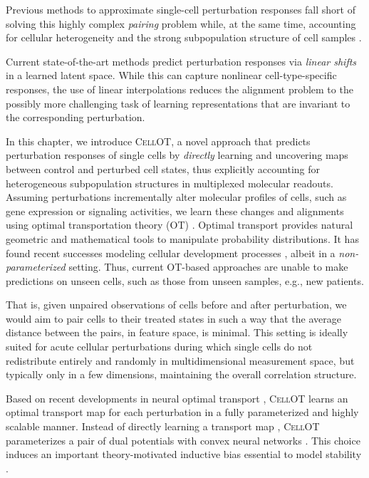 Previous methods to approximate single-cell perturbation responses fall short of solving this highly complex \emph{pairing} problem while, at the same time,
accounting for cellular heterogeneity and the strong subpopulation structure of cell samples \cite{wu2021single,gonzalez2020tumor,li2022single}.

Current state-of-the-art methods \cite{Lopez2018scvi, lotfollahi2019scgen, yang2020predicting} predict perturbation responses via \emph{linear shifts} in a learned %
latent space.
While this can capture nonlinear cell-type-specific responses, the use of linear interpolations reduces the alignment problem 
to the possibly more challenging task of learning representations that are invariant to the corresponding perturbation.


In this chapter, we introduce \textsc{CellOT}, a novel approach that predicts perturbation responses of single cells by \emph{directly} learning and uncovering maps 
between control and perturbed cell states, thus explicitly accounting for heterogeneous subpopulation structures in multiplexed molecular readouts.
Assuming perturbations incrementally alter molecular profiles of cells, such as gene expression or signaling activities,
we learn these changes and alignments using optimal transportation theory (OT) \cite{villani2009optimal}.
Optimal transport provides natural geometric and mathematical tools to manipulate probability distributions.
It has found recent successes modeling cellular development processes \cite{lavenant2021towards, schiebinger2019optimal},
albeit in a \emph{non-parameterized} setting.
Thus, current OT-based approaches are unable to make predictions on unseen cells, such as those from unseen samples, e.g., new patients.

That is, given unpaired observations of cells before and after perturbation,
we would aim to pair cells to their treated states in such a way that the average distance between the pairs, in feature space, is minimal.
This setting is ideally suited for acute cellular perturbations during which single cells do not redistribute entirely and randomly in multidimensional measurement space,
but typically only in a few dimensions, maintaining the overall correlation structure.

Based on recent developments in neural optimal transport \cite{makkuva2020optimal},
\textsc{CellOT} learns an optimal transport map for each perturbation in a fully parameterized and highly scalable manner.
Instead of directly learning a transport map \cite{jacob2018w2gan, yang2018scalable, prasad2020optimal},
\textsc{CellOT} parameterizes a pair of dual potentials with convex neural networks \cite{amos2017input}.
This choice induces an important theory-motivated inductive bias essential to model stability \cite{makkuva2020optimal}.


